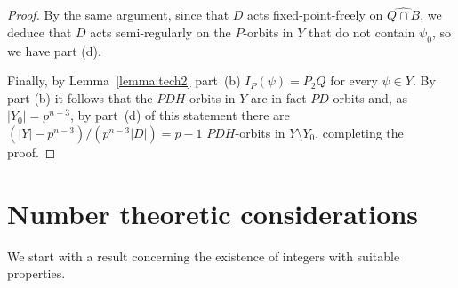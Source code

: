 \documentclass{amsart}
\begin{document}
\begin{proof}
By the same argument, since   that $D$ acts fixed-point-freely on $\widehat{Q \cap B}$, we deduce that
  $D$ acts semi-regularly  on the $P$-orbits in $Y$ that do not contain $\psi_0$, so we have part (d).

  Finally, by Lemma~\ref{lemma:tech2} part~(b) $I_P(\psi) = P_2Q$ for every $\psi \in Y$. By part (b) it follows that
  the $PDH$-orbits in $Y$ are in fact $PD$-orbits and, as $|Y_0| = p^{n-3}$, by part~(d) of this statement
  there are $(|Y| - p^{n-3})/(p^{n-3}|D|) = p-1$ $PDH$-orbits in $Y\setminus Y_0$, completing the proof.
\end{proof}

\section{Number theoretic considerations}\label{thrm:number theory}
We start with a result concerning the existence of integers with suitable properties.
\end{document}
